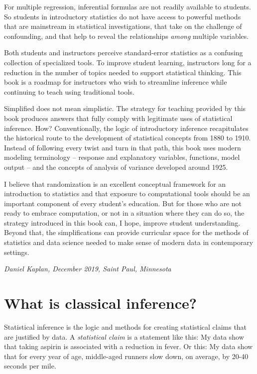 \documentclass[]{tufte-book}
\begin{document}
For multiple regression, inferential formulas are not readily available to students. So students in introductory statistics do not have access to powerful methods that are mainstream in statistical investigations, that take on the challenge of confounding, and that help to reveal the relationships \emph{among} multiple variables.

Both students and instructors perceive standard-error statistics as a confusing collection of specialized tools. To improve student learning, instructors long for a reduction in the number of topics needed to support statistical thinking. This book is a roadmap for instructors who wish to streamline inference while continuing to teach using traditional tools.

Simplified does not mean simplistic. The strategy for teaching provided by this book produces answers that fully comply with legitimate uses of statistical inference. How? Conventionally, the logic of introductory inference recapitulates the historical route to the development of statistical concepts from 1880 to 1910. Instead of following every twist and turn in that path, this book uses modern modeling terminology -- response and explanatory variables, functions, model output -- and the concepts of analysis of variance developed around 1925.

I believe that randomization is an excellent conceptual framework for an introduction to statistics and that exposure to computational tools should be an important component of every student's education. But for those who are not ready to embrace computation, or not in a situation where they can do so, the strategy introduced in this book can, I hope, improve student understanding. Beyond that, the simplifications can provide curricular space for the methods of statistics and data science needed to make sense of modern data in contemporary settings.

\emph{Daniel Kaplan, December 2019, Saint Paul, Minnesota}

\hypertarget{what-is-classical-inference}{%
\chapter{What is classical inference?}\label{what-is-classical-inference}}

Statistical inference is the logic and methods for creating statistical claims that are justified by data. A \emph{statistical claim} is a statement like this: My data show that taking aspirin is associated with a reduction in fever. Or this: My data show that for every year of age, middle-aged runners slow down, on average, by 20-40 seconds per mile.
\end{document}
